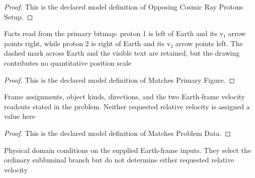 \begin{proof}
  This is the declared model definition of Opposing Cosmic Ray Protons Setup.
\end{proof}
\begin{definition}
  \label{def:physics:phyx-mini-0558:phyxminiproblems-problemphyxmini0558-matchesprimaryfigure}
  Facts read from the primary bitmap: proton 1 is left of Earth and its v₁ arrow points right, while proton 2 is right of Earth and its v₂ arrow points left. The dashed mark across Earth and the visible text are retained, but the drawing contributes no quantitative position scale
\end{definition}
\begin{proof}
  This is the declared model definition of Matches Primary Figure.
\end{proof}
\begin{definition}
  \label{def:physics:phyx-mini-0558:phyxminiproblems-problemphyxmini0558-matchesproblemdata}
  Frame assignments, object kinds, directions, and the two Earth-frame velocity readouts stated in the problem. Neither requested relative velocity is assigned a value here
\end{definition}
\begin{proof}
  This is the declared model definition of Matches Problem Data.
\end{proof}
\begin{definition}
  \label{def:physics:phyx-mini-0558:phyxminiproblems-problemphyxmini0558-hasphysicalinputparameters}
  Physical domain conditions on the supplied Earth-frame inputs. They select the ordinary subluminal branch but do not determine either requested relative velocity
\end{definition}
